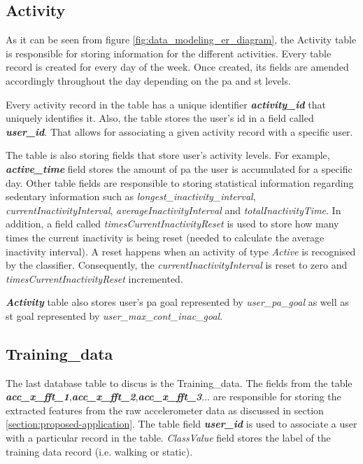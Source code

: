         \subsection{Activity}
        As it can be seen from figure \ref{fig:data_modeling_er_diagram}, the Activity table is responsible for storing information for the different activities. Every table record is created for every day of the week. Once created, its fields are amended accordingly throughout the day depending on the \gls{pa} and \gls{st} levels. 
        
        Every activity record in the table has a unique identifier \textbf{\textit{activity\_id}} that uniquely identifies it. Also, the table stores the user's id in a field called \textbf{\textit{user\_id}}. That allows for associating a given activity record with a specific user.
        
        The table is also storing fields that store user's activity levels. For example, \textbf{\textit{active\_time}} field stores the amount of \gls{pa} the user is accumulated for a specific day. Other table fields are responsible to storing statistical information regarding sedentary information such as \textit{longest\_inactivity\_interval}, \textit{currentInactivityInterval}, \textit{averageInactivityInterval} and \textit{totalInactivityTime}. In addition, a field called \textit{timesCurrentInactivityReset} is used to store how many times the current inactivity is being reset (needed to calculate the average inactivity interval). A reset happens when an activity of type \textit{Active} is recognised by the classifier. Consequently, the \textit{currentInactivityInterval} is reset to zero and \textit{timesCurrentInactivityReset} incremented.
        
        
        \textbf{\textit{Activity}} table also stores user's \gls{pa} goal represented by \textit{user\_pa\_goal} as well as \gls{st} goal represented by \textit{user\_max\_cont\_inac\_goal}.
        
        \subsection{Training\_data}
        The last database table to discus is the Training\_data. The fields from the table \textbf{\textit{acc\_x\_fft\_1}},\newline\textbf{\textit{acc\_x\_fft\_2}},\textbf{\textit{acc\_x\_fft\_3}}... are responsible for storing the extracted features from the raw accelerometer data as discussed in section \ref{section:proposed-application}. The table field \textbf{\textit{user\_id}} is used to associate a user with a particular record in the table. \textit{ClassValue} field stores the label of the training data record (i.e. walking or static).
        
